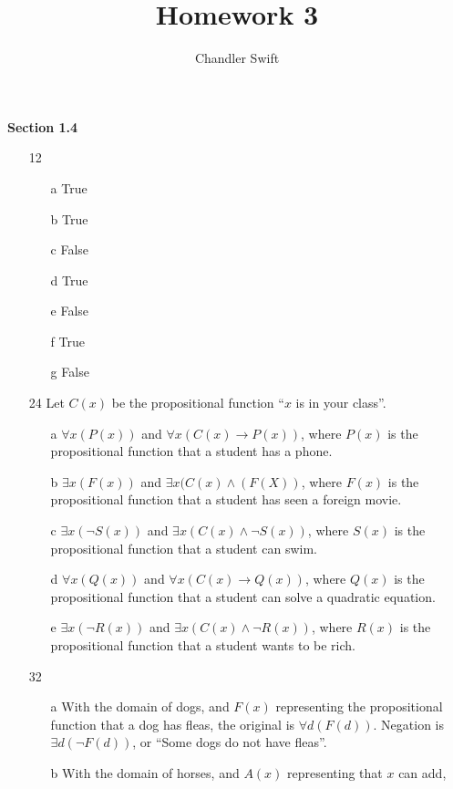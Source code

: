 \documentclass{article}
\title{Homework 3}
\author{Chandler Swift}
\begin{document}
\maketitle
\textbf{Section 1.4}
\begin{itemize}
  \item[12]
    \begin{itemize}
      \item[a] True
      \item[b] True
      \item[c] False
      \item[d] True
      \item[e] False
      \item[f] True
      \item[g] False
    \end{itemize}
  \item[24]
    Let $C(x)$ be the propositional function ``$x$ is in your class''.
    \begin{itemize}
      \item[a] $\forall x (P(x))$ and $\forall x (C(x) \to P(x))$, where
        $P(x)$ is the propositional function that a student has a phone.
      \item[b] $\exists x (F(x))$ and $\exists x (C(x) \land (F(X))$, where
        $F(x)$ is the propositional function that a student has seen a foreign
        movie.
      \item[c] $\exists x (\neg S(x))$ and $\exists x (C(x) \land \neg S(x))$,
        where $S(x)$ is the propositional function that a student can swim.
      \item[d] $\forall x (Q(x))$ and $\forall x (C(x) \to Q(x))$, where
        $Q(x)$ is the propositional function that a student can solve a
        quadratic equation.
      \item[e] $\exists x (\neg R(x))$ and $\exists x (C(x) \land \neg R(x))$,
        where $R(x)$ is the propositional function that a student wants to be
        rich.
    \end{itemize}
  \item[32]
    \begin{itemize}
      \item[a] With the domain of dogs, and $F(x)$ representing the propositional
        function that a dog has fleas, the original is $\forall d (F(d))$. Negation
        is $\exists d (\neg F(d))$, or ``Some dogs do not have fleas''.
      \item[b] With the domain of horses, and $A(x)$ representing that $x$ can add,

\end{itemize}
\end{itemize}
\end{document}
